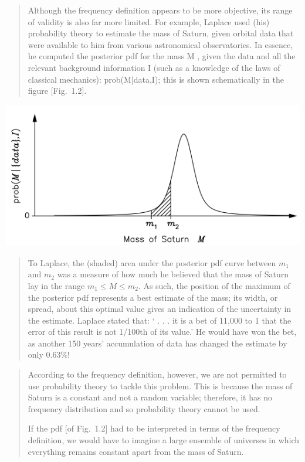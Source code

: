 \documentclass[%
oneside,                 %
final,                   %
10pt]{article}
\begin{document}
\begin{quote}
Although the frequency definition appears to be more objective, its range of validity is also far more limited. For example, Laplace used (his) probability theory to estimate the mass of Saturn, given orbital data that were available to him from various astronomical observatories. In essence, he computed the posterior pdf for the mass M , given the data and all the relevant background information I (such as a knowledge of the laws of classical mechanics): prob(M|{data},I); this is shown schematically in the figure [Fig.~1.2].
\end{quote}




\vspace{6mm}

\centerline{\includegraphics[width=0.9\linewidth]{fig/sivia_fig_1_2.png}}

\vspace{6mm}




\begin{quote}
To Laplace, the (shaded) area under the posterior pdf curve between $m_1$ and $m_2$ was a measure of how much he believed that the mass of Saturn lay in the range $m_1 \le M \le m_2$. As such, the position of the maximum of the posterior pdf represents a best estimate of the mass; its width, or spread, about this optimal value gives an indication of the uncertainty in the estimate. Laplace stated that: ‘ . . . it is a bet of 11,000 to 1 that the error of this result is not 1/100th of its value.’ He would have won the bet, as another 150 years’ accumulation of data has changed the estimate by only 0.63\%!
\end{quote}



\begin{quote}
According to the frequency definition, however, we are not permitted to use probability theory to tackle this problem. This is because the mass of Saturn is a constant and not a random variable; therefore, it has no frequency distribution and so probability theory cannot be used.

If the pdf [of Fig.~1.2] had to be interpreted in terms of the frequency definition, we would have to imagine a large ensemble of universes in which everything remains constant apart from the mass of Saturn.
\end{quote}
\end{document}
